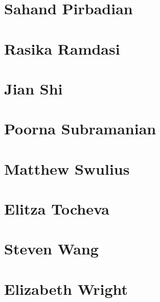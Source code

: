\documentclass[]{tufte-book}
\begin{document}
\hypertarget{sahand_pirbadian}{%
\section*{Sahand Pirbadian}\label{sahand_pirbadian}}

\hypertarget{rasika_ramdasi}{%
\section*{Rasika Ramdasi}\label{rasika_ramdasi}}

\hypertarget{jian_shi}{%
\section*{Jian Shi}\label{jian_shi}}

\hypertarget{poorna_subramanian}{%
\section*{Poorna Subramanian}\label{poorna_subramanian}}

\hypertarget{matthew_swulius}{%
\section*{Matthew Swulius}\label{matthew_swulius}}

\hypertarget{elitza_tocheva}{%
\section*{Elitza Tocheva}\label{elitza_tocheva}}

\hypertarget{steven_wang}{%
\section*{Steven Wang}\label{steven_wang}}

\hypertarget{elizabeth_wright}{%
\section*{Elizabeth Wright}\label{elizabeth_wright}}
\end{document}
